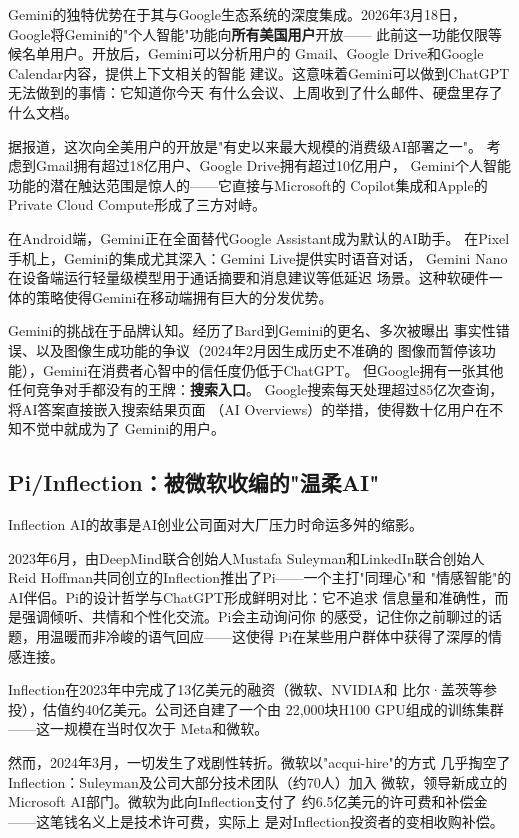 Gemini的独特优势在于其与Google生态系统的深度集成。2026年3月18日，
Google将Gemini的"个人智能"功能向\textbf{所有美国用户}开放——
此前这一功能仅限等候名单用户。开放后，Gemini可以分析用户的
Gmail、Google Drive和Google Calendar内容，提供上下文相关的智能
建议。这意味着Gemini可以做到ChatGPT无法做到的事情：它知道你今天
有什么会议、上周收到了什么邮件、硬盘里存了什么文档。

据报道，这次向全美用户的开放是"有史以来最大规模的消费级AI部署之一"。
考虑到Gmail拥有超过18亿用户、Google Drive拥有超过10亿用户，
Gemini个人智能功能的潜在触达范围是惊人的——它直接与Microsoft的
Copilot集成和Apple的Private Cloud Compute形成了三方对峙。

在Android端，Gemini正在全面替代Google Assistant成为默认的AI助手。
在Pixel手机上，Gemini的集成尤其深入：Gemini Live提供实时语音对话，
Gemini Nano在设备端运行轻量级模型用于通话摘要和消息建议等低延迟
场景。这种软硬件一体的策略使得Gemini在移动端拥有巨大的分发优势。

Gemini的挑战在于品牌认知。经历了Bard到Gemini的更名、多次被曝出
事实性错误、以及图像生成功能的争议（2024年2月因生成历史不准确的
图像而暂停该功能），Gemini在消费者心智中的信任度仍低于ChatGPT。
但Google拥有一张其他任何竞争对手都没有的王牌：\textbf{搜索入口}。
Google搜索每天处理超过85亿次查询，将AI答案直接嵌入搜索结果页面
（AI Overviews）的举措，使得数十亿用户在不知不觉中就成为了
Gemini的用户。

\subsection{Pi/Inflection：被微软收编的"温柔AI"}
\label{subsec:pi-inflection}

Inflection AI的故事是AI创业公司面对大厂压力时命运多舛的缩影。

2023年6月，由DeepMind联合创始人Mustafa Suleyman和LinkedIn联合创始人
Reid Hoffman共同创立的Inflection推出了Pi——一个主打"同理心"和
"情感智能"的AI伴侣。Pi的设计哲学与ChatGPT形成鲜明对比：它不追求
信息量和准确性，而是强调倾听、共情和个性化交流。Pi会主动询问你
的感受，记住你之前聊过的话题，用温暖而非冷峻的语气回应——这使得
Pi在某些用户群体中获得了深厚的情感连接。

Inflection在2023年中完成了13亿美元的融资（微软、NVIDIA和
比尔·盖茨等参投），估值约40亿美元。公司还自建了一个由
22,000块H100 GPU组成的训练集群——这一规模在当时仅次于
Meta和微软。

然而，2024年3月，一切发生了戏剧性转折。微软以"acqui-hire"的方式
几乎掏空了Inflection：Suleyman及公司大部分技术团队（约70人）加入
微软，领导新成立的Microsoft AI部门。微软为此向Inflection支付了
约6.5亿美元的许可费和补偿金——这笔钱名义上是技术许可费，实际上
是对Inflection投资者的变相收购补偿。

